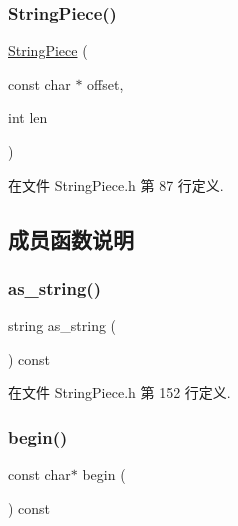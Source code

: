 \subsubsection{\texorpdfstring{String\+Piece()}{StringPiece()}\hspace{0.1cm}{\footnotesize\ttfamily [5/5]}}
{\footnotesize\ttfamily \hyperlink{classmuduo_1_1StringPiece}{String\+Piece} (\begin{DoxyParamCaption}\item[{const char $\ast$}]{offset,  }\item[{int}]{len }\end{DoxyParamCaption})\hspace{0.3cm}{\ttfamily [inline]}}



在文件 String\+Piece.\+h 第 87 行定义.



\subsection{成员函数说明}
\mbox{\label{classmuduo_1_1StringPiece_a53670f3465c15e32425fd9180b53e962}} 
\subsubsection{\texorpdfstring{as\+\_\+string()}{as\_string()}}
{\footnotesize\ttfamily string as\+\_\+string (\begin{DoxyParamCaption}{ }\end{DoxyParamCaption}) const\hspace{0.3cm}{\ttfamily [inline]}}



在文件 String\+Piece.\+h 第 152 行定义.

\mbox{\label{classmuduo_1_1StringPiece_a5386e98f71cb440232f0c41041f50af4}} 
\subsubsection{\texorpdfstring{begin()}{begin()}}
{\footnotesize\ttfamily const char$\ast$ begin (\begin{DoxyParamCaption}{ }\end{DoxyParamCaption}) const\hspace{0.3cm}{\ttfamily [inline]}}



